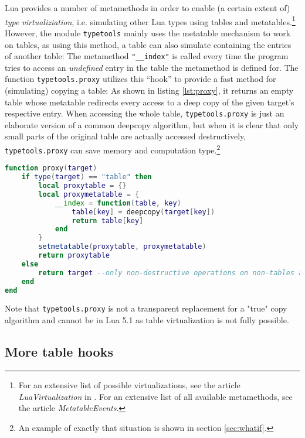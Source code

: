 Lua provides a number of metamethods in order to enable (a certain extent of) \emph{type virtualiziation}, i.e. simulating other Lua types using tables and metatables.\footnote{For an extensive list of possible virtualizations, see the article \emph{LuaVirtualization} in \cite{LuaUsersWiki}. For an extensive list of all available metamethods, see the article \emph{MetatableEvents}.} However, the module \texttt{typetools} mainly uses the metatable mechanism to work on tables, as using this method, a table can also simulate containing the entries of another table: The metamethod \texttt{"\_\_index"} is called every time the program tries to access an \emph{undefined} entry in the table the metamethod is defined for. The function \texttt{typetools.proxy} utilizes this ``hook'' to provide a fast method for (simulating) copying a table: As shown in listing \ref{lst:proxy}, it returns an empty table whose metatable redirects every access to a deep copy of the given target's respective entry. When accessing the whole table, \texttt{typetools.proxy} is just an elaborate version of a common deepcopy algorithm, but when it is clear that only small parts of the original table are actually accessed destructively, \texttt{typetools.proxy} can save memory and computation type.\footnote{An example of exactly that situation is shown in section \ref{sec:whatif}.}

\begin{lstlisting}[language=lua, caption={The function \texttt{typetools.proxy}}, label=lst:proxy, name=lst:proxy]
function proxy(target)
	if type(target) == "table" then
		local proxytable = {}
		local proxymetatable = {
			__index = function(table, key)
				table[key] = deepcopy(target[key])
				return table[key]
			end
		}
		setmetatable(proxytable, proxymetatable)
		return proxytable
	else
		return target --only non-destructive operations on non-tables anyway
	end
end
\end{lstlisting}

Note that \texttt{typetools.proxy} is not a transparent replacement for a "true" copy algorithm and cannot be in Lua 5.1 as table virtualization is not fully possible.

\subsection{More table hooks}

